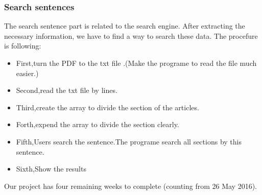 \subsubsection{Search sentences}

The search sentence part is related to the search engine.
 After extracting the necessary information, we have to find a way to search these data.
 The procefure is following:
\begin{itemize}
	
	\item First,turn the PDF to the txt file .(Make the programe  to read the file much easier.)
	\item Second,read the txt file by lines.
	\item Third,create the array to divide the section of the articles.
	\item Forth,expend the array to divide the section clearly.
	\item Fifth,Users search the sentence.The programe search all sections by this sentence.
	\item Sixth,Show the results
	
\end{itemize}

Our project has four remaining weeks to complete (counting from 26 May 2016).

\newpage %